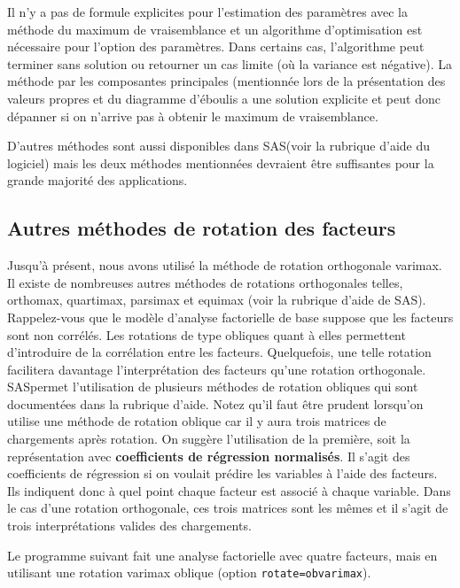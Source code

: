 \documentclass[
]{book}
\theoremstyle{definition}
\theoremstyle{definition}
\theoremstyle{definition}
\theoremstyle{remark}
\begin{document}
Il n'y a pas de formule explicites pour l'estimation des paramètres avec la méthode du maximum de vraisemblance et un algorithme d'optimisation est nécessaire pour l'option des paramètres. Dans certains cas, l'algorithme peut terminer sans solution ou retourner un cas limite (où la variance est négative). La méthode par les composantes principales (mentionnée lors de la présentation des valeurs propres et du diagramme d'éboulis a une solution explicite et peut donc dépanner si on n'arrive pas à obtenir le maximum de vraisemblance.

D'autres méthodes sont aussi disponibles dans \textsf{SAS}(voir la rubrique d'aide du logiciel) mais les deux méthodes mentionnées devraient être suffisantes pour la grande majorité des applications.

\hypertarget{autres-muxe9thodes-de-rotation-des-facteurs}{%
\subsection{Autres méthodes de rotation des facteurs}\label{autres-muxe9thodes-de-rotation-des-facteurs}}

Jusqu'à présent, nous avons utilisé la méthode de rotation orthogonale varimax. Il existe de nombreuses autres méthodes de rotations orthogonales telles, orthomax, quartimax, parsimax et equimax (voir la rubrique d'aide de \textsf{SAS}). Rappelez-vous que le modèle d'analyse factorielle de base suppose que les facteurs sont non corrélés. Les rotations de type obliques quant à elles permettent d'introduire de la corrélation entre les facteurs. Quelquefois, une telle rotation facilitera davantage l'interprétation des facteurs qu'une rotation orthogonale. \textsf{SAS}permet l'utilisation de plusieurs méthodes de
rotation obliques qui sont documentées dans la rubrique d'aide. Notez qu'il faut être prudent lorsqu'on utilise une méthode de rotation oblique car il y aura trois matrices de chargements après rotation. On suggère l'utilisation de la première, soit la représentation avec \textbf{coefficients de régression normalisés}. Il s'agit des coefficients de régression si on voulait prédire les variables à l'aide des facteurs. Ils indiquent donc à quel point chaque facteur est associé à chaque variable. Dans le cas d'une rotation orthogonale, ces trois matrices sont les mêmes et il s'agit de trois interprétations valides des chargements.

Le programme suivant fait une analyse factorielle avec quatre facteurs, mais en utilisant une rotation varimax oblique (option \texttt{rotate=obvarimax}).
\end{document}
